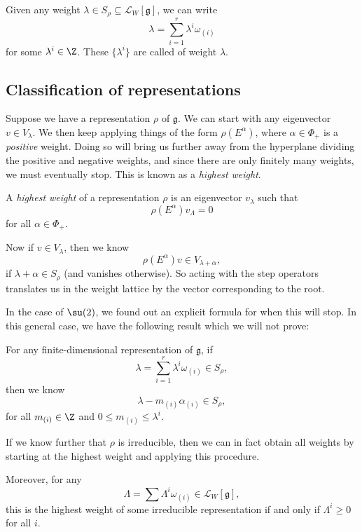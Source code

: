 \documentclass[a4paper]{article}
\begin{document}
Given any weight $\lambda \in S_\rho \subseteq \mathcal{L}_W[\mathfrak{g}]$, we can write
\[
  \lambda = \sum_{i = 1}^r \lambda^i \omega_{(i)}
\]
for some $\lambda^i \in \Z$. These $\{\lambda^i\}$ are called  of weight $\lambda$.

%
\subsection{Classification of representations}
Suppose we have a representation $\rho$ of $\mathfrak{g}$. We can start with any eigenvector $v \in V_\lambda$. We then keep applying things of the form $\rho(E^\alpha)$, where $\alpha \in \Phi_+$ is a \emph{positive} weight. Doing so will bring us further away from the hyperplane dividing the positive and negative weights, and since there are only finitely many weights, we must eventually stop. This is known as a \emph{highest weight}.

\begin{defi}
  A \emph{highest weight} of a representation $\rho$ is an eigenvector $v_\lambda$ such that
  \[
    \rho(E^\alpha) v_\Lambda = 0
  \]
  for all $\alpha \in \Phi_+$.
\end{defi}

Now if $v \in V_\lambda$, then we know
\[
  \rho(E^\alpha) v \in V_{\lambda + \alpha},
\]
if $\lambda + \alpha \in S_\rho$ (and vanishes otherwise). So acting with the step operators translates us in the weight lattice by the vector corresponding to the root.

In the case of $\su(2)$, we found out an explicit formula for when this will stop. In this general case, we have the following result which we will not prove:

\begin{thm}
  For any finite-dimensional representation of $\mathfrak{g}$, if
  \[
    \lambda = \sum_{i = 1}^r \lambda^i \omega_{(i)} \in S_\rho,
  \]
  then we know
  \[
    \lambda - m_{(i)} \alpha_{(i)} \in S_\rho,
  \]
  for all $m_{(i)} \in \Z$ and $0 \leq m_{(i)} \leq \lambda^i$.

  If we know further that $\rho$ is irreducible, then we can in fact obtain all weights by starting at the highest weight and applying this procedure.

  Moreover, for any
  \[
    \Lambda = \sum \Lambda^i \omega_{(i)} \in \mathcal{L}_W[\mathfrak{g}],
  \]
  this is the highest weight of some irreducible representation if and only if $\Lambda^i \geq 0$ for all $i$.
\end{thm}
\end{document}
